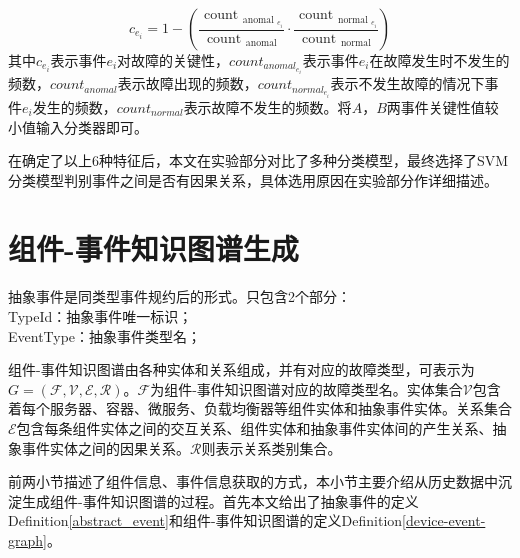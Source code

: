 \begin{equation}
    c_{e_{i}}=1-\left(\frac{ \text { count }_{\text {anomal }_{e_{i}}}}{\text { count }_{\text {anomal }}} \cdot \frac{  \text { count }_{\text {normal }_{e_{i}}}}{\text { count }_{\text {normal }}}\right)
    \label{6eventservity}
\end{equation}
其中$c_{e_i}$表示事件$e_i$对故障的关键性，${count}_{{anomal}_{e_i}}$表示事件$e_i$在故障发生时不发生的频数，${count}_{anomal}$表示故障出现的频数，${count}_{{normal}_{e_i}}$表示不发生故障的情况下事件$e_i$发生的频数，${count}_{normal}$表示故障不发生的频数。将$A$，$B$两事件关键性值较小值输入分类器即可。

在确定了以上6种特征后，本文在实验部分对比了多种分类模型，最终选择了SVM分类模型判别事件之间是否有因果关系，具体选用原因在实验部分作详细描述。

\section{组件-事件知识图谱生成}\label{graph-generate}
\begin{definition}[抽象事件]
    抽象事件是同类型事件规约后的形式。只包含2个部分：
    \\TypeId：抽象事件唯一标识；
    \\EventType：抽象事件类型名；
    \label{abstract_event}
\end{definition}
\begin{definition}[组件-事件知识图谱]
    组件-事件知识图谱由各种实体和关系组成，并有对应的故障类型，可表示为$G=(\mathcal{F}, \mathcal{V}, \mathcal{E}, \mathcal{R})$。$\mathcal{F}$为组件-事件知识图谱对应的故障类型名。实体集合$\mathcal{V}$包含着每个服务器、容器、微服务、负载均衡器等组件实体和抽象事件实体。关系集合$\mathcal{E}$包含每条组件实体之间的交互关系、组件实体和抽象事件实体间的产生关系、抽象事件实体之间的因果关系。$\mathcal{R}$则表示关系类别集合。
    \label{device-event-graph}
\end{definition}

前两小节描述了组件信息、事件信息获取的方式，本小节主要介绍从历史数据中沉淀生成组件-事件知识图谱的过程。首先本文给出了抽象事件的定义Definition\ref{abstract_event}和组件-事件知识图谱的定义Definition\ref{device-event-graph}。

